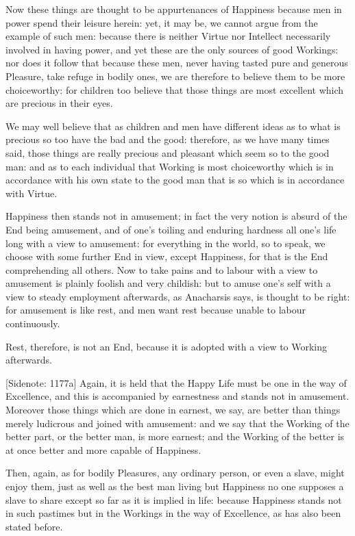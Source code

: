 Now these things are thought to be appurtenances of Happiness because
men in power spend their leisure herein: yet, it may be, we cannot
argue from the example of such men: because there is neither Virtue nor
Intellect necessarily involved in having power, and yet these are the
only sources of good Workings: nor does it follow that because these
men, never having tasted pure and generous Pleasure, take refuge in
bodily ones, we are therefore to believe them to be more choiceworthy:
for children too believe that those things are most excellent which are
precious in their eyes.

We may well believe that as children and men have different ideas as to
what is precious so too have the bad and the good: therefore, as we have
many times said, those things are really precious and pleasant which
seem so to the good man: and as to each individual that Working is most
choiceworthy which is in accordance with his own state to the good man
that is so which is in accordance with Virtue.

Happiness then stands not in amusement; in fact the very notion is
absurd of the End being amusement, and of one's toiling and enduring
hardness all one's life long with a view to amusement: for everything in
the world, so to speak, we choose with some further End in view, except
Happiness, for that is the End comprehending all others. Now to take
pains and to labour with a view to amusement is plainly foolish and
very childish: but to amuse one's self with a view to steady employment
afterwards, as Anacharsis says, is thought to be right: for amusement is
like rest, and men want rest because unable to labour continuously.

Rest, therefore, is not an End, because it is adopted with a view to
Working afterwards.

[Sidenote: 1177a] Again, it is held that the Happy Life must be one in
the way of Excellence, and this is accompanied by earnestness and stands
not in amusement. Moreover those things which are done in earnest, we
say, are better than things merely ludicrous and joined with amusement:
and we say that the Working of the better part, or the better man, is
more earnest; and the Working of the better is at once better and more
capable of Happiness.

Then, again, as for bodily Pleasures, any ordinary person, or even
a slave, might enjoy them, just as well as the best man living but
Happiness no one supposes a slave to share except so far as it is
implied in life: because Happiness stands not in such pastimes but in
the Workings in the way of Excellence, as has also been stated before.


